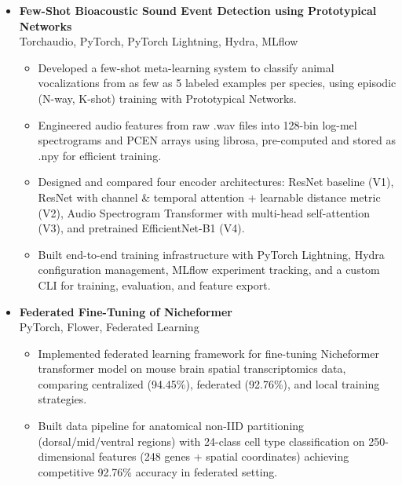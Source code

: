 \documentclass[a4paper,11pt]{article}
\newcommand{\cvitem}[1]{\item\small{#1}}
\newcommand{\cvproject}[2]{
  \vspace{2pt}
  \textbf{#1}\\
  \small{#2}\vspace{-4pt}
}
\newenvironment{cvitemlist}
  {\begin{itemize}[leftmargin=0.4cm, topsep=1pt, itemsep=0pt, parsep=0pt, label=\textbullet]}
  {\end{itemize}}
\newenvironment{cvsection}
  {\begin{itemize}[leftmargin=0cm, label={}, topsep=0pt, itemsep=-2pt]}
  {\end{itemize}}
\begin{document}
\begin{cvsection}
  \item
  \cvproject
    {Few-Shot Bioacoustic Sound Event Detection using Prototypical Networks \href{https://github.com/nnayz/prototypical-networks-bioacoustics}{\faGithub}}
    {Torchaudio, PyTorch, PyTorch Lightning, Hydra, MLflow}
  \begin{cvitemlist}
    \cvitem{Developed a few-shot meta-learning system to classify animal vocalizations from as few as 5 labeled examples per species, using episodic (N-way, K-shot) training with Prototypical Networks.}
    \cvitem{Engineered audio features from raw .wav files into 128-bin log-mel spectrograms and PCEN arrays using librosa, pre-computed and stored as .npy for efficient training.}
    \cvitem{Designed and compared four encoder architectures: ResNet baseline (V1), ResNet with channel \& temporal attention + learnable distance metric (V2), Audio Spectrogram Transformer with multi-head self-attention (V3), and pretrained EfficientNet-B1 (V4).}
    \cvitem{Built end-to-end training infrastructure with PyTorch Lightning, Hydra configuration management, MLflow experiment tracking, and a custom CLI for training, evaluation, and feature export.}
  \end{cvitemlist}

  \item
  \cvproject
    {Federated Fine-Tuning of Nicheformer \href{https://github.com/nnayz/ft-nicheformer}{\faGithub}}
    {PyTorch, Flower, Federated Learning}
  \begin{cvitemlist}
    \cvitem{Implemented federated learning framework for fine-tuning Nicheformer transformer model on mouse brain spatial transcriptomics data, comparing centralized (94.45\%), federated (92.76\%), and local training strategies.}
    \cvitem{Built data pipeline for anatomical non-IID partitioning (dorsal/mid/ventral regions) with 24-class cell type classification on 250-dimensional features (248 genes + spatial coordinates) achieving competitive 92.76\% accuracy in federated setting.}
  \end{cvitemlist}


\end{cvsection}
\end{document}
